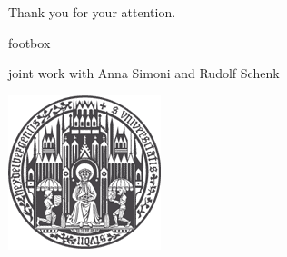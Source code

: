 \documentclass[english,fleqn]{beamer}%
\renewcommand{\1}{\mathbbm{1}}
\newcommand{\dr}{\color{dred}}
\newcommand{\dgrau}{\color{gray}}
\theoremstyle{mydefi}
\theoremstyle{mynote}
\begin{document}
\begin{frame}
\vfill
\centerline{\Large \dr Thank you for your attention.}
\vfill  
\end{frame}




{%
\begin{beamercolorbox}[ht=2.5ex,dp=1.5ex]{footbox} 
\end{beamercolorbox}%
} 

\begin{frame}
\begin{overlayarea}{\textwidth}{.1\textheight}%
\end{overlayarea}
\begin{overlayarea}{\textwidth}{.74\textheight}%
  \titlepage
\end{overlayarea}
\begin{overlayarea}{\textwidth}{.1\textheight}%
{\begin{minipage}[t]{.11\textwidth}\hfill\null
\end{minipage}}
\hfill{\dgrau\small joint work with Anna Simoni and Rudolf  Schenk}\hfill
{\begin{minipage}[t]{.11\textwidth}
\includegraphics[scale=.23]{./Images/siegel_uni_hd_gross.png}
\end{minipage}}
\end{overlayarea}
\end{frame}
\end{document}
